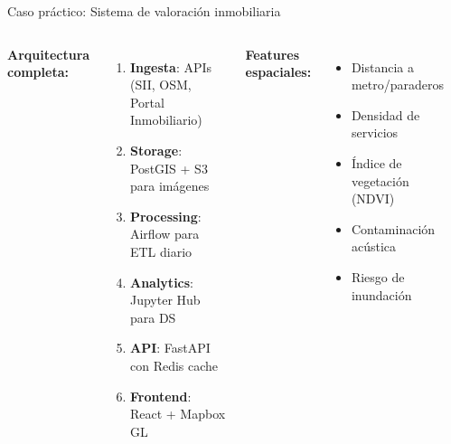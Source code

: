 \documentclass[10pt,aspectratio=169]{beamer}
\begin{document}
\begin{frame}{Caso práctico: Sistema de valoración inmobiliaria}
    \begin{columns}[T]
        \textbf{Arquitectura completa:}
        \begin{enumerate}
            \item \textbf{Ingesta}: APIs (SII, OSM, Portal Inmobiliario)
            \item \textbf{Storage}: PostGIS + S3 para imágenes
            \item \textbf{Processing}: Airflow para ETL diario
            \item \textbf{Analytics}: Jupyter Hub para DS
            \item \textbf{API}: FastAPI con Redis cache
            \item \textbf{Frontend}: React + Mapbox GL
        \end{enumerate}
        
        \vspace{0.3cm}
        \textbf{Features espaciales:}
        \begin{itemize}
            \item Distancia a metro/paraderos
            \item Densidad de servicios
            \item Índice de vegetación (NDVI)
            \item Contaminación acústica
            \item Riesgo de inundación
        \end{itemize}
        
        \begin{center}
\end{center}
\end{columns}
\end{frame}
\end{document}
